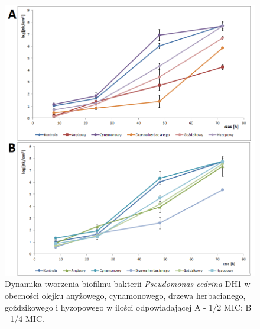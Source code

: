 \documentclass[11pt,a4paper]{report}
\begin{document}
\begin{figure}[!h]
\begin{center}
\includegraphics[scale=0.68]{img/dh1-a.png}
\caption{Dynamika tworzenia biofilmu bakterii \textit{Pseudomonas cedrina} DH1 w obecności olejku anyżowego, cynamonowego, drzewa herbacianego, goździkowego i hyzopowego w ilości odpowiadającej A - 1/2 MIC; B - 1/4 MIC.}\label{dh1-a}
\end{center} 
\end{figure}
\end{document}
